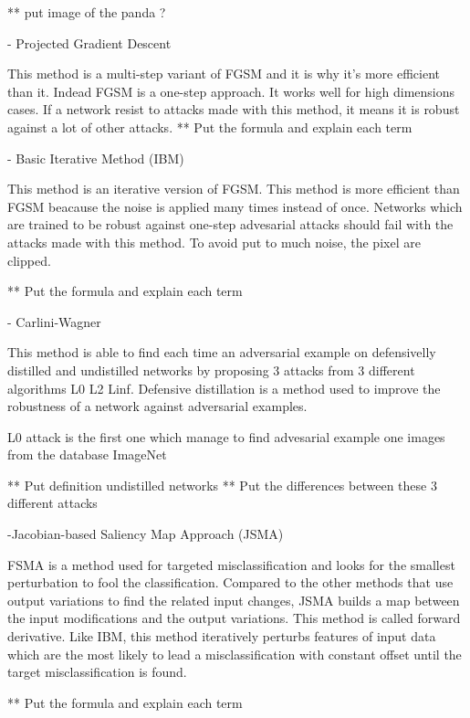 ** put image of the panda ?


- Projected Gradient Descent

This method is a multi-step variant of FGSM and it is why it's more efficient than it. Indead FGSM is a one-step approach.
It works well for high dimensions cases. 
If a network resist to attacks made with this method, it means it is robust against a lot of other attacks.
** Put the formula and explain each term

- Basic Iterative Method (IBM)

This method is an iterative version of FGSM. This method is more efficient than FGSM beacause the noise is applied many times instead of once.  Networks which are trained to be robust against one-step advesarial attacks should fail with the attacks made with this method. To avoid put to much noise, the pixel are clipped.

** Put the formula and explain each term

- Carlini-Wagner

This method is able to find each time an adversarial example on defensivelly distilled and undistilled networks by proposing  3 attacks from 3  different algorithms L0 L2 Linf.  Defensive distillation is a method used to improve the robustness of a network against adversarial examples.

L0 attack  is the first one which manage to find advesarial example one images from the database ImageNet

** Put definition undistilled networks
** Put the differences between these 3 different attacks

-Jacobian-based Saliency Map Approach (JSMA)

FSMA is a method  used for targeted misclassification and looks for the smallest perturbation to fool the classification. Compared to the other methods that use output variations to find the related input changes, JSMA builds a map between the input modifications and the output variations. This method is called forward derivative. Like IBM, this method iteratively perturbs features of input data which are the most likely to lead a misclassification with constant offset until the target misclassification is found.

 
** Put the formula and explain each term
















